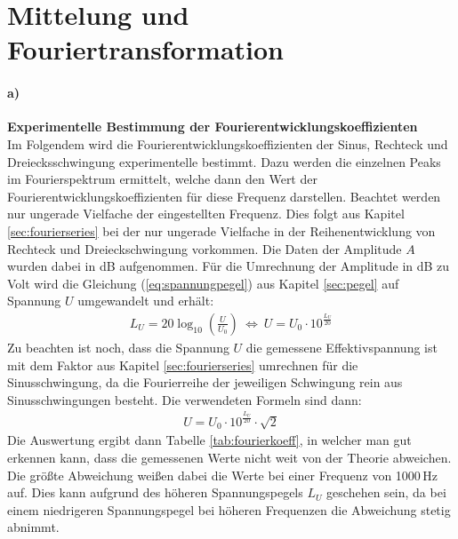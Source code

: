 
\section{Mittelung und Fouriertransformation}
\label{sec:mittelungAndTrafo}

\paragraph{a)}\textbf{Experimentelle Bestimmung der Fourierentwicklungskoeffizienten}\\
Im Folgendem wird die Fourierentwicklungskoeffizienten der Sinus, Rechteck und Dreiecksschwingung experimentelle bestimmt. Dazu werden die einzelnen Peaks im Fourierspektrum ermittelt, welche dann den Wert der Fourierentwicklungskoeffizienten für diese Frequenz darstellen. Beachtet werden nur ungerade Vielfache der eingestellten Frequenz. Dies folgt aus Kapitel \ref{sec:fourierseries} bei der nur ungerade Vielfache in der Reihenentwicklung von Rechteck und Dreieckschwingung vorkommen. Die Daten der Amplitude $A$ wurden dabei in dB aufgenommen. Für die Umrechnung der Amplitude in dB zu Volt wird die Gleichung (\ref{eq:spannungpegel}) aus Kapitel \ref{sec:pegel} auf Spannung $U$ umgewandelt und erhält:
\begin{gather}
    L_U = 20 \log_{10}\left(\frac{U}{U_0}\right)~\Leftrightarrow~U = U_0 \cdot 10^{\frac{L_U}{20}}
\end{gather}
Zu beachten ist noch, dass die Spannung $U$ die gemessene Effektivspannung ist mit dem Faktor aus Kapitel \ref{sec:fourierseries} umrechnen für die Sinusschwingung, da die Fourierreihe der jeweiligen Schwingung rein aus Sinusschwingungen besteht. Die verwendeten Formeln sind dann:
\begin{gather}
    U = U_0 \cdot 10^{\frac{L_U}{20}} \cdot \sqrt{2}    
    \label{eq:umrechnung}
\end{gather}
Die Auswertung ergibt dann Tabelle \ref{tab:fourierkoeff}, in welcher man gut erkennen kann, dass die gemessenen Werte nicht weit von der Theorie abweichen. Die größte Abweichung weißen dabei die Werte bei einer Frequenz von 1000\,Hz auf. Dies kann aufgrund des höheren Spannungspegels $L_U$ geschehen sein, da bei einem niedrigeren Spannungspegel bei höheren Frequenzen die Abweichung stetig abnimmt.
\newpage
